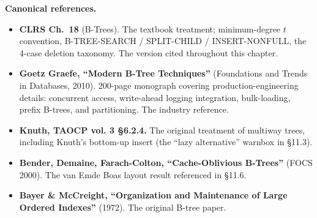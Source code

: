 \documentclass[11pt]{article}
\begin{document}
\begin{notebox}
\textbf{Canonical references.}
\begin{itemize}[leftmargin=*]
    \item \textbf{CLRS Ch.~18} (B-Trees). The textbook treatment;
          minimum-degree $t$ convention, B-TREE-SEARCH /
          SPLIT-CHILD / INSERT-NONFULL, the 4-case deletion
          taxonomy. The version cited throughout this chapter.
    \item \textbf{Goetz Graefe, ``Modern B-Tree Techniques''}
          (Foundations and Trends in Databases, 2010). 200-page
          monograph covering production-engineering details:
          concurrent access, write-ahead logging integration,
          bulk-loading, prefix B-trees, and partitioning. The
          industry reference.
    \item \textbf{Knuth, TAOCP vol. 3 \S6.2.4.} The original
          treatment of multiway trees, including Knuth's bottom-up
          insert (the ``lazy alternative'' warnbox in \S11.3).
    \item \textbf{Bender, Demaine, Farach-Colton, ``Cache-Oblivious
          B-Trees''} (FOCS 2000). The van Emde Boas layout result
          referenced in \S11.6.
    \item \textbf{Bayer \& McCreight, ``Organization and Maintenance
          of Large Ordered Indexes''} (1972). The original B-tree
          paper.
\end{itemize}
\end{notebox}
\end{document}
